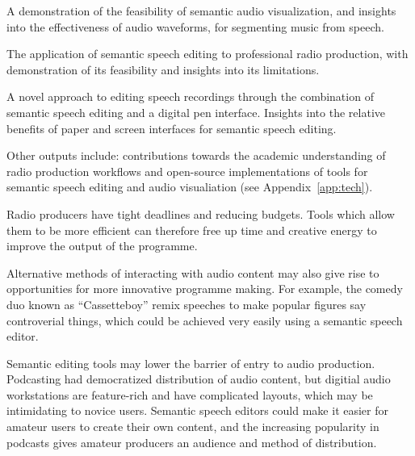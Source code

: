   A demonstration of the feasibility of semantic audio visualization, and insights into the
  effectiveness of audio waveforms, for segmenting music from speech.

  The application of semantic speech editing to professional radio production, with
  demonstration of its feasibility and insights into its limitations. 

  A novel approach to editing speech recordings through the combination of semantic speech
  editing and a digital pen interface. Insights into the relative benefits of paper and screen interfaces for semantic
  speech editing.

  Other outputs include: contributions towards the academic understanding of radio production workflows
  and open-source implementations of tools for semantic speech editing and audio visualiation (see
  Appendix~\ref{app:tech}).




  Radio producers have tight deadlines and reducing budgets. Tools which allow them to be more efficient can therefore
  free up time and creative energy to improve the output of the programme.

  Alternative methods of interacting with audio content may also give rise to opportunities for more innovative programme
  making.
  For example, the comedy duo known as ``Cassetteboy'' \citep{Perraudin2014} remix speeches to make popular figures say
  controverial things, which could be achieved very easily using a semantic speech editor.

  Semantic editing tools may lower the barrier of entry to audio production.
  Podcasting had democratized distribution of audio content, but digitial audio workstations are feature-rich
  and have complicated layouts, which may be intimidating to novice users.
  Semantic speech editors could make it easier for amateur users to create their own content, and the increasing
  popularity in podcasts gives amateur producers an audience and method of distribution.

